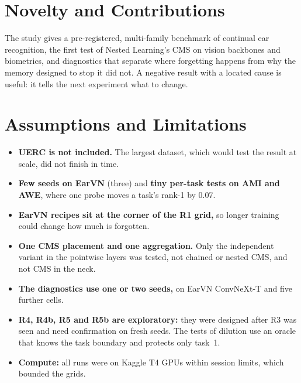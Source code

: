 \documentclass[12pt,a4paper]{report}
\begin{document}
\section{Novelty and Contributions}
The study gives a pre-registered, multi-family benchmark of continual ear recognition, the first test of Nested Learning's CMS on vision backbones and biometrics, and diagnostics that separate where forgetting happens from why the memory designed to stop it did not. A negative result with a located cause is useful: it tells the next experiment what to change.

\section{Assumptions and Limitations}
\begin{itemize}
\item \textbf{UERC is not included.} The largest dataset, which would test the result at scale, did not finish in time.
\item \textbf{Few seeds on EarVN} (three) and \textbf{tiny per-task tests on AMI and AWE}, where one probe moves a task's rank-1 by 0.07.
\item \textbf{EarVN recipes sit at the corner of the R1 grid,} so longer training could change how much is forgotten.
\item \textbf{One CMS placement and one aggregation.} Only the independent variant in the pointwise layers was tested, not chained or nested CMS, and not CMS in the neck.
\item \textbf{The diagnostics use one or two seeds,} on EarVN ConvNeXt-T and five further cells.
\item \textbf{R4, R4b, R5 and R5b are exploratory:} they were designed after R3 was seen and need confirmation on fresh seeds. The tests of dilution use an oracle that knows the task boundary and protects only task~1.
\item \textbf{Compute:} all runs were on Kaggle T4 GPUs within session limits, which bounded the grids.
\end{itemize}
\end{document}
